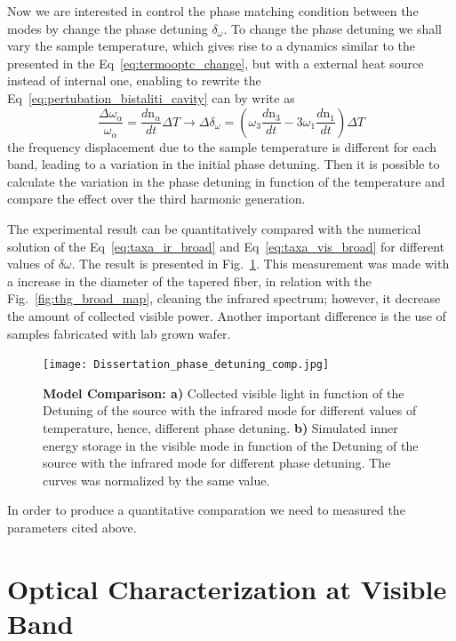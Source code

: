 Now we are interested in control the phase matching condition between the modes by change the phase detuning $\delta_\omega$. To change the phase detuning we shall vary the sample temperature, which gives rise to a dynamics similar to the presented in the Eq~\ref{eq:termooptc_change}, but with a external heat source instead of internal one, enabling to rewrite the Eq~\ref{eq:pertubation_bistaliti_cavity} can by write as 
\begin{equation}
    \frac{\Delta\omega_\alpha}{\omega_\alpha} = \frac{d\text{n}_\alpha}{dt}\Delta T \rightarrow \Delta\delta_\omega = \left(\omega_3\frac{d\text{n}_3}{dt} - 3\omega_1\frac{d\text{n}_1}{dt}\right)\Delta T
    \label{eq:temperature_mode_variation}
\end{equation}
the frequency displacement due to the sample temperature is different for each band, leading to a variation in the initial phase detuning. Then it is possible to calculate the variation in the phase detuning in function of the temperature and compare the effect over the third harmonic generation. 

The experimental result can be quantitatively compared with the numerical solution of the Eq~\ref{eq:taxa_ir_broad} and Eq~\ref{eq:taxa_vis_broad} for different values of $\delta\omega$. The result is presented in Fig.~\ref{fig:thg_control_phase_det}. This measurement was made with a increase in the diameter of the tapered fiber, in relation with the Fig.~\ref{fig:thg_broad_map}, cleaning the infrared spectrum; however, it decrease the amount of collected visible power. Another important difference is the use of samples fabricated with lab grown wafer.
\begin{figure}[!h]
    \centering
    \texttt{[image: Dissertation\_phase\_detuning\_comp.jpg]}
    \caption{\textbf{Model Comparison: a)} Collected visible light in function of the Detuning of the source with the infrared mode for different values of temperature, hence, different phase detuning. \textbf{b)} Simulated inner energy storage in the visible mode in function of the Detuning of the source with the infrared mode for different phase detuning. The curves was normalized by the same value.}
    \label{fig:thg_control_phase_det}
\end{figure}

In order to produce a quantitative comparation we need to measured the parameters cited above.  

\section{Optical Characterization at Visible Band}

